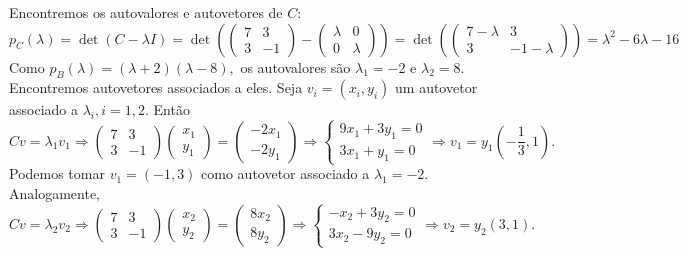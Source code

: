 \documentclass[11pt,a4paper]{article}
\begin{document}
{{\task[\pers{c}] Encontremos os autovalores e autovetores de $C:$
\[
p_C(\lambda) = \det(C - \lambda I) = \det \left( \begin{pmatrix}
7 & 3 \\
3 & -1
\end{pmatrix} - \begin{pmatrix}
\lambda & 0 \\
0 & \lambda
\end{pmatrix}  \right) = \det \left( \begin{pmatrix}
7-\lambda & 3 \\
3 & -1-\lambda
\end{pmatrix}  \right) = \lambda^2 - 6\lambda - 16
\]
Como $p_B(\lambda) = (\lambda + 2)(\lambda - 8),$ os autovalores são $\lambda_1 = -2$ e $\lambda_2 = 8.$ Encontremos autovetores associados a eles. Seja $v_i = (x_i,y_i)$ um autovetor associado a $\lambda_i, i =1,2.$ Então
\[
Cv=  \lambda_1 v_1 \Rightarrow \begin{pmatrix}
7 & 3 \\
3 & -1
\end{pmatrix} \begin{pmatrix}
x_1 \\ y_1
\end{pmatrix} =  \begin{pmatrix}
-2x_1 \\ -2y_1
\end{pmatrix} \Rightarrow \begin{cases}
9x_1+3y_1 = 0 \\
3x_1 + y_1 = 0
\end{cases} \Rightarrow v_1 = y_1 \left(-\frac{1}{3}, 1 \right).
\]
Podemos tomar $v_1 = (-1,3)$ como autovetor associado a $\lambda_1 = -2.$ Analogamente,
\[
Cv=  \lambda_2 v_2 \Rightarrow \begin{pmatrix}
7 & 3 \\
3 & -1
\end{pmatrix} \begin{pmatrix}
x_2 \\ y_2
\end{pmatrix} =  \begin{pmatrix}
8x_2 \\ 8y_2
\end{pmatrix} \Rightarrow \begin{cases}
-x_2+3y_2 = 0 \\
3x_2 - 9y_2 = 0
\end{cases} \Rightarrow v_2 = y_2 \left(3, 1 \right).
\]

}}
\end{document}

